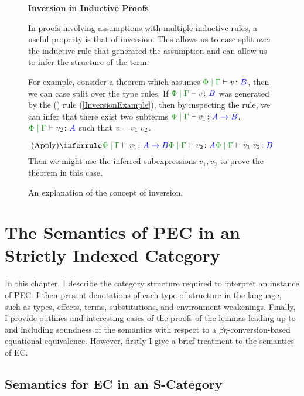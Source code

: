 \documentclass{Report}
\begin{document}
\begin{figure}
    \begin{framed}
        \textbf{Inversion in Inductive Proofs}

        In proofs involving assumptions with multiple inductive rules, a useful property is that of inversion. This allows us to case split over the inductive rule that generated the assumption and can allow us to infer the structure of the term.

        For example, consider a theorem which assumes $\gpetyperelation{v}{B}$, then we can case split over the type rules. If $\gpetyperelation{v}{B}$ was generated by the (\textit{\vapply}) rule (\ref{InversionExample}), then by inspecting the rule, we can infer that there exist two subterms $\gpetyperelation{v_1}{\ab}$, $\gpetyperelation{v_2}{A}$ such that $v = v_1\; v_2$. 

        \begin{equation}\label{InversionExample}
            \ntreeruleII{\vapply}{\gpetyperelation{v_1}{\ab}}{\gpetyperelation{v_2}{A}}{\gpetyperelation{\apply{v_1}{v_2}}{B}}
        \end{equation}
        Then we might use the inferred subexpressions $v_1, v_2$ to prove the theorem in this case.
    \end{framed}
    \caption{An explanation of the concept of inversion.}
    \label{InversionPrinciple}
\end{figure}


\chapter{The Semantics of PEC in an Strictly Indexed Category}
In this chapter, I  describe the category structure required to interpret an instance of PEC\@. I then present denotations of each type of structure in the language, such as types, effects, terms, substitutions, and environment weakenings. Finally, I provide outlines and interesting cases of the proofs of the lemmas leading up to and including soundness of the semantics with respect to a $\beta\eta$-conversion-based equational equivalence. However, firstly I give a brief treatment to the semantics of EC.


\section{Semantics for EC in an S-Category}\label{SCategoryIntro}
\end{document}

